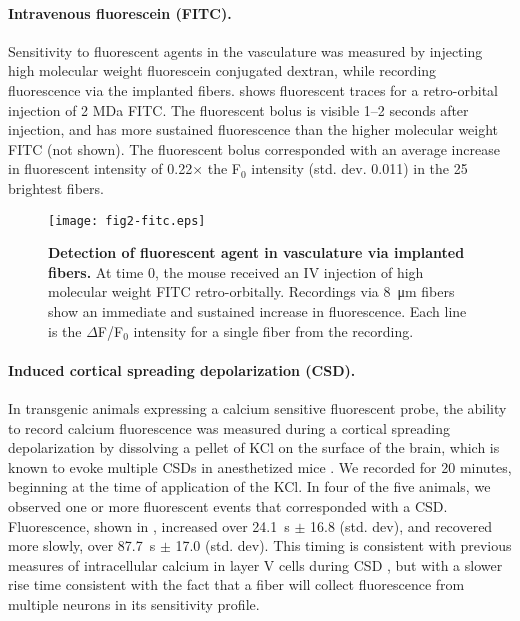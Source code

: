 \paragraph{Intravenous fluorescein (FITC).} Sensitivity to fluorescent agents in 
the vasculature was measured by injecting high molecular weight 
fluorescein conjugated dextran, while recording fluorescence via the 
implanted fibers.  shows fluorescent traces for a retro-orbital 
injection of 2 MDa FITC. The fluorescent bolus is visible 1--2 seconds
 after injection, and has more sustained fluorescence than the higher 
molecular weight FITC (not shown). The fluorescent bolus corresponded 
with an average increase in fluorescent intensity of 0.22$\times$ the 
F$_0$ intensity (std. dev. 0.011) in the 25 brightest fibers.

\begin{figure}
\texttt{[image: fig2-fitc.eps]}
\caption[Recording of FITC in vasculature]{\textbf{Detection of fluorescent agent in vasculature via implanted fibers.} At
 time 0, the mouse received an IV injection of high molecular weight 
FITC retro-orbitally. Recordings via 8~\si{\micro\meter} fibers show 
an immediate and sustained increase in fluorescence. Each line is the 
$\Delta$F/F$_0$ intensity for a single fiber from the recording.}
\label{fig:iv-fitc}
\end{figure}

\paragraph{Induced cortical spreading depolarization (CSD).} In 
transgenic animals 
expressing a calcium sensitive fluorescent probe, the ability to 
record calcium fluorescence was measured during a cortical spreading 
depolarization by dissolving a pellet of KCl on the surface of the 
brain, which is known to evoke multiple CSDs in anesthetized mice 
\cite{Karatas:2013ir}. We recorded for 20 minutes, beginning at the 
time of application of the KCl. In four of the five animals, we 
observed one or more fluorescent events that corresponded with a CSD. 
Fluorescence, shown in , increased over 24.1~s $\pm$ 16.8 (std.
 dev), and recovered more slowly, over 87.7~s $\pm$ 17.0 (std. dev). 
This timing is consistent with previous measures of intracellular 
calcium in layer V cells during CSD \cite{Gniel:2010jn}, but with a 
slower rise time consistent with the fact that a fiber will collect 
fluorescence from multiple neurons in its sensitivity profile.

